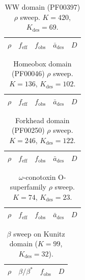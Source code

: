\begin{table}[ht]
  \centering
  \caption{WW domain (PF00397) $\rho$ sweep. $K=420$, $K_{\mathrm{des}}=69$.}
  \label{tab:ww-rho}
  \small
  \begin{tabular}{ccccc}
    \toprule
    $\rho$ & $f_{\mathrm{eff}}$ & $f_{\mathrm{obs}}$ & $\bar{a}_{\mathrm{des}}$ & $D$ \\
    \midrule
    
  \end{tabular}
\end{table}

\begin{table}[ht]
  \centering
  \caption{Homeobox domain (PF00046) $\rho$ sweep. $K=136$, $K_{\mathrm{des}}=102$.}
  \label{tab:homeobox-rho}
  \small
  \begin{tabular}{ccccc}
    \toprule
    $\rho$ & $f_{\mathrm{eff}}$ & $f_{\mathrm{obs}}$ & $\bar{a}_{\mathrm{des}}$ & $D$ \\
    \midrule
    
  \end{tabular}
\end{table}

\begin{table}[ht]
  \centering
  \caption{Forkhead domain (PF00250) $\rho$ sweep. $K=246$, $K_{\mathrm{des}}=122$.}
  \label{tab:forkhead-rho}
  \small
  \begin{tabular}{ccccc}
    \toprule
    $\rho$ & $f_{\mathrm{eff}}$ & $f_{\mathrm{obs}}$ & $\bar{a}_{\mathrm{des}}$ & $D$ \\
    \midrule
    
  \end{tabular}
\end{table}

\begin{table}[ht]
  \centering
  \caption{$\omega$-conotoxin O-superfamily $\rho$ sweep. $K=74$,
  $K_{\mathrm{des}}=23$.}
  \label{tab:conotoxin-rho}
  \small
  \begin{tabular}{ccccc}
    \toprule
    $\rho$ & $f_{\mathrm{eff}}$ & $f_{\mathrm{obs}}$ & $\bar{a}_{\mathrm{des}}$ & $D$ \\
    \midrule
    
  \end{tabular}
\end{table}

\begin{table}[ht]
  \centering
  \caption{$\beta$ sweep on Kunitz domain ($K=99$, $K_{\mathrm{des}}=32$).}
  \label{tab:beta-sweep}
  \small
  \begin{tabular}{cccc}
    \toprule
    $\rho$ & $\beta/\beta^{*}$ & $f_{\mathrm{obs}}$ & $D$ \\
    \midrule
    
  \end{tabular}
\end{table}

